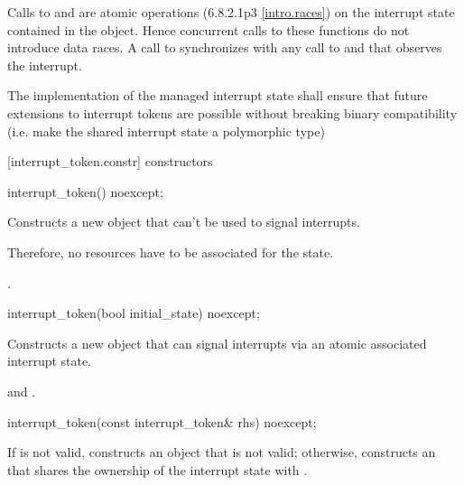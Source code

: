 {Calls to  and 
are atomic operations (6.8.2.1p3 \ref{intro.races})
on the interrupt state contained in the  object.
Hence concurrent calls to these functions do not introduce data races. 
A call to  synchronizes with any call to  and
 that observes the interrupt.

\begin{note} The implementation of the managed interrupt state
        shall ensure that future extensions to interrupt tokens
        are possible without breaking binary compatibility 
        (i.e. make the shared interrupt state a polymorphic type) \end{note}

[interrupt_token.constr]{ constructors}

%
\begin{itemdecl}
interrupt_token() noexcept;
\end{itemdecl}
\begin{itemdescr}
  \pnum\effects Constructs a new  object that can't be used to signal interrupts.
                \begin{note} Therefore, no resources have to be associated for the state.  \end{note}

  \pnum\postconditions {}.
\end{itemdescr}

%
\begin{itemdecl}
interrupt_token(bool initial_state) noexcept;
\end{itemdecl}
\begin{itemdescr}
  \pnum\effects Constructs a new  object that can signal interrupts
                via an atomic associated interrupt state.

  \pnum\postconditions {} and .
\end{itemdescr}

%
\begin{itemdecl}
interrupt_token(const interrupt_token& rhs) noexcept;
\end{itemdecl}
\begin{itemdescr}
  \pnum\effects If  is not valid, constructs an  object
                that is not valid;
                otherwise, constructs an 
                that shares the ownership of the interrupt state with .


\end{itemdescr}}
